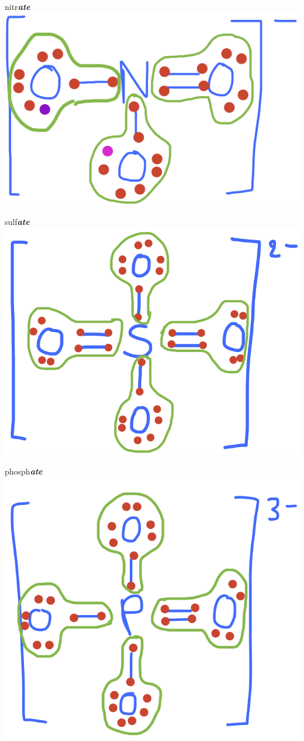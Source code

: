 \documentclass[]{book}
\theoremstyle{definition}
\theoremstyle{definition}
\theoremstyle{definition}
\theoremstyle{remark}
\begin{document}
nitr\emph{\textbf{ate}}~\includegraphics{pictures/ElecAlloc_NO3-.png}

sulf\emph{\textbf{ate}}~\includegraphics{pictures/ElecAlloc_SO42-.png}

phosph\emph{\textbf{ate}}~\includegraphics{pictures/ElecAlloc_PO43-.png}
\end{document}
